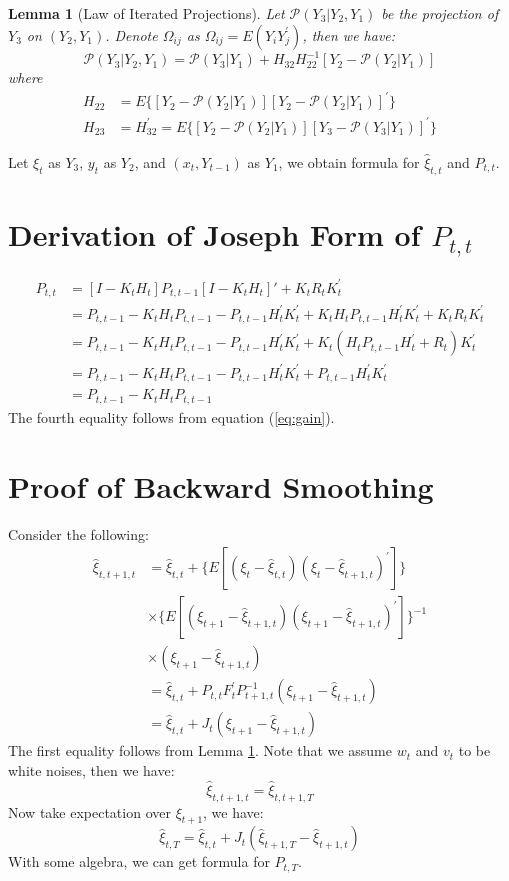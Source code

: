 \documentclass[12pt]{article}
\newtheorem{lemma}{Lemma}
\numberwithin{equation}{section}
\begin{document}
\begin{lemma}[Law of Iterated Projections] \label{lem:1}
    Let $\mathcal{P}(Y_3|Y_2,Y_1)$ be the projection of $Y_3$ on $(Y_2, Y_1)$. Denote $\Omega_{ij}$ as $\Omega_{ij} = E(Y_iY_j^{'})$, then we have:
    \[
        \mathcal{P}(Y_3|Y_2,Y_1) = \mathcal{P}(Y_3|Y_1)+H_{32}H_{22}^{-1}[Y_2 - \mathcal{P}(Y_2|Y_1)]
    \]
    where 
    \begin{align*}
        H_{22} &= E\{[Y_2-\mathcal{P}(Y_2|Y_1)][Y_2-\mathcal{P}(Y_2|Y_1)]^{'}\} \\
        H_{23} &= H_{32}^{'} = E\{[Y_2-\mathcal{P}(Y_2|Y_1)][Y_3-\mathcal{P}(Y_3|Y_1)]^{'}\} 
    \end{align*}

\end{lemma}
Let $\xi_t$ as $Y_3$, $y_t$ as $Y_2$, and $(x_t,Y_{t-1})$ as $Y_1$, we obtain formula for $\hat{\xi}_{t,t}$ and $P_{t,t}$.

\section{Derivation of Joseph Form of $P_{t,t}$} \label{ap:joseph}
\begin{align*}
    P_{t,t} &= [I - K_tH_t]P_{t,t-1}[I - K_tH_t]' + K_tR_tK_t^{'} \\
    &= P_{t,t-1} - K_tH_tP_{t,t-1} - P_{t,t-1}H_t^{'}K_t^{'} + K_tH_tP_{t,t-1}H_t^{'}K_t^{'} + K_tR_tK_t^{'} \\
    &= P_{t,t-1} - K_tH_tP_{t,t-1} - P_{t,t-1}H_t^{'}K_t^{'} + K_t(H_tP_{t,t-1}H_t^{'} + R_t)K_t^{'} \\
    &= P_{t,t-1} - K_tH_tP_{t,t-1} - P_{t,t-1}H_t^{'}K_t^{'} + P_{t,t-1}H_t^{'}K_t^{'} \\
    &= P_{t,t-1} - K_tH_tP_{t,t-1}
\end{align*}
The fourth equality follows from equation (\ref{eq:gain}).
\section{Proof of Backward Smoothing} \label{ap:smooth}
Consider the following:
\begin{align*}
    \hat{\xi}_{t,t+1,t} &= \hat{\xi}_{t,t} + \{E[(\xi_t-\hat{\xi}_{t,t})(\xi_t-\hat{\xi}_{t+1,t})^{'}]\} \\
    & \times \{E[(\xi_{t+1}-\hat{\xi}_{t+1,t})(\xi_{t+1}-\hat{\xi}_{t+1,t})^{'}]\}^{-1} \\
    & \times (\xi_{t+1} - \hat{\xi}_{t+1,t}) \\
    &= \hat{\xi}_{t,t} + P_{t,t}F_t^{'}P_{t+1,t}^{-1}(\xi_{t+1}-\hat{\xi}_{t+1,t}) \\
    &= \hat{\xi}_{t,t} + J_t(\xi_{t+1}-\hat{\xi}_{t+1,t})
\end{align*}
The first equality follows from Lemma \ref{lem:1}. Note that we assume $w_t$ and $v_t$ to be white noises, then we have:
\[
    \hat{\xi}_{t,t+1,t} = \hat{\xi}_{t,t+1,T}
\]
Now take expectation over $\xi_{t+1}$, we have:
\[
    \hat{\xi}_{t,T} = \hat{\xi}_{t,t} + J_t(\hat{\xi}_{t+1,T}-\hat{\xi}_{t+1,t})
\]
With some algebra, we can get formula for $P_{t,T}$.
\end{document}
